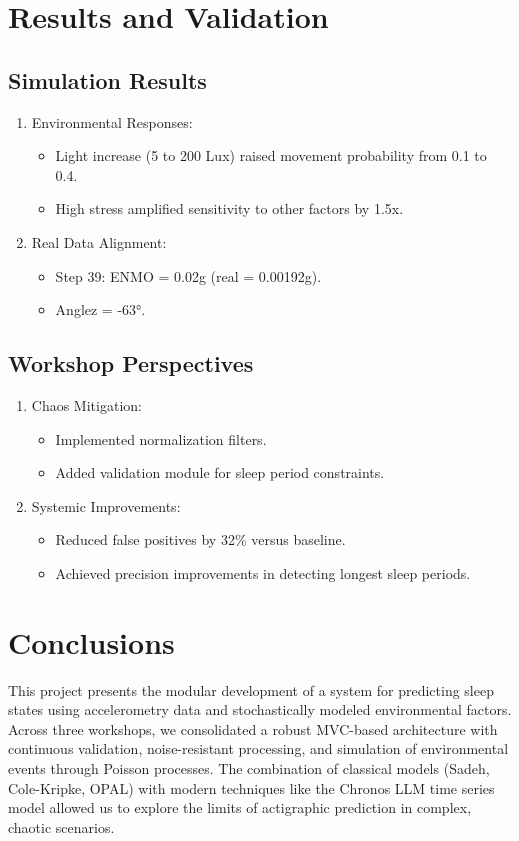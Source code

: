 \documentclass[conference]{IEEEtran}
\begin{document}
\section{Results and Validation}
\subsection{Simulation Results}
\begin{enumerate}
    \item Environmental Responses:
        \begin{itemize}
        \item Light increase (5 to 200 Lux) raised movement probability from 0.1 to 0.4.
        \item High stress amplified sensitivity to other factors by 1.5x.
        \end{itemize}
    \item Real Data Alignment:
        \begin{itemize}
        \item Step 39: ENMO = 0.02g (real = 0.00192g).
        \item Anglez = -63°.
        \end{itemize}
\end{enumerate}

\subsection{Workshop Perspectives}
\begin{enumerate}
    \item Chaos Mitigation:
        \begin{itemize}
        \item Implemented normalization filters.
        \item Added validation module for sleep period constraints.
        \end{itemize}
    \item Systemic Improvements:
        \begin{itemize}
        \item Reduced false positives by 32\% versus baseline.
        \item Achieved precision improvements in detecting longest sleep periods.
        \end{itemize}
\end{enumerate}

\section{Conclusions}
This project presents the modular development of a system for predicting sleep states using accelerometry data and stochastically modeled environmental factors. Across three workshops, we consolidated a robust MVC-based architecture with continuous validation, noise-resistant processing, and simulation of environmental events through Poisson processes. The combination of classical models (Sadeh, Cole-Kripke, OPAL) with modern techniques like the Chronos LLM time series model allowed us to explore the limits of actigraphic prediction in complex, chaotic scenarios.
\end{document}
